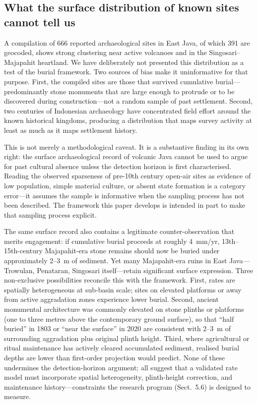 \documentclass[12pt,a4paper]{article}
\begin{document}
\subsection{What the surface distribution of known sites cannot tell us}

A compilation of 666 reported archaeological sites in East Java, of which 391 are geocoded, shows strong clustering near active volcanoes and in the Singosari--Majapahit heartland. We have deliberately not presented this distribution as a test of the burial framework. Two sources of bias make it uninformative for that purpose. First, the compiled sites are those that survived cumulative burial---predominantly stone monuments that are large enough to protrude or to be discovered during construction---not a random sample of past settlement. Second, two centuries of Indonesian archaeology have concentrated field effort around the known historical kingdoms, producing a distribution that maps survey activity at least as much as it maps settlement history.

This is not merely a methodological caveat. It is a substantive finding in its own right: the surface archaeological record of volcanic Java cannot be used to argue for past cultural absence unless the detection horizon is first characterised. Reading the observed sparseness of pre-10th century open-air sites as evidence of low population, simple material culture, or absent state formation is a category error---it assumes the sample is informative when the sampling process has not been described. The framework this paper develops is intended in part to make that sampling process explicit.

The same surface record also contains a legitimate counter-observation that merits engagement: if cumulative burial proceeds at roughly 4~mm/yr, 13th--15th-century Majapahit-era stone remains should now be buried under approximately 2--3~m of sediment. Yet many Majapahit-era ruins in East Java---Trowulan, Penataran, Singosari itself---retain significant surface expression. Three non-exclusive possibilities reconcile this with the framework. First, rates are spatially heterogeneous at sub-basin scale; sites on elevated platforms or away from active aggradation zones experience lower burial. Second, ancient monumental architecture was commonly elevated on stone plinths or platforms (one to three metres above the contemporary ground surface), so that ``half buried'' in 1803 or ``near the surface'' in 2020 are consistent with 2--3~m of surrounding aggradation plus original plinth height. Third, where agricultural or ritual maintenance has actively cleared accumulated sediment, realised burial depths are lower than first-order projection would predict. None of these undermines the detection-horizon argument; all suggest that a validated rate model must incorporate spatial heterogeneity, plinth-height correction, and maintenance history---constraints the research program (Sect.~5.6) is designed to measure.
\end{document}
